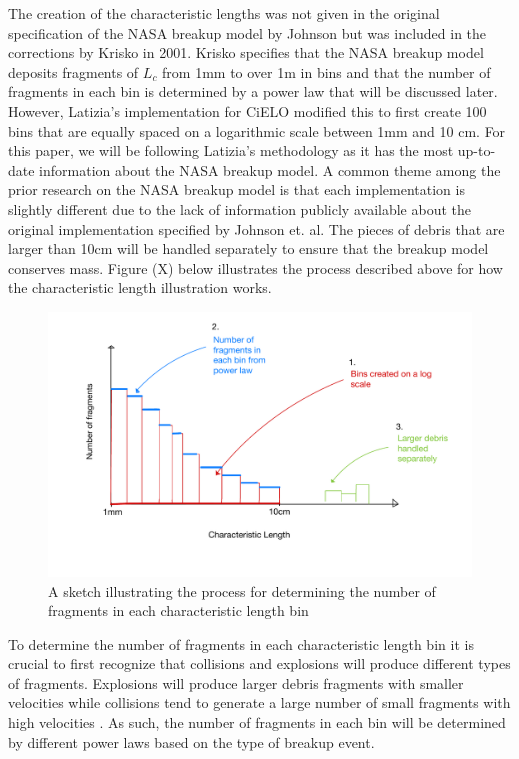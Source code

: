 \documentclass{article}
\begin{document}
The creation of the characteristic lengths was not given in the original specification of the NASA breakup model by Johnson but was included in the corrections by Krisko in 2001. Krisko specifies that the NASA breakup model deposits fragments of $L_c$ from 1mm to over 1m in bins and that the number of fragments in each bin is determined by a power law that will be discussed later. However, Latizia's implementation for CiELO modified this to first create 100 bins that are equally spaced on a logarithmic scale between 1mm and 10 cm. For this paper, we will be following Latizia's methodology as it has the most up-to-date information about the NASA breakup model. A common theme among the prior research on the NASA breakup model is that each implementation is slightly different due to the lack of information publicly available about the original implementation specified by Johnson et. al. The pieces of debris that are larger than 10cm will be handled separately to ensure that the breakup model conserves mass. Figure (X) below illustrates the process described above for how the characteristic length illustration works.

\begin{figure}[H]
	\centering
	\includegraphics[scale=0.6]{L_c_sketch}
	\caption{A sketch illustrating the process for determining the number of fragments in each characteristic length bin}
\end{figure}

To determine the number of fragments in each characteristic length bin it is crucial to first recognize that collisions and explosions will produce different types of fragments. Explosions will produce larger debris fragments with smaller velocities while collisions tend to generate a large number of small fragments with high velocities \citep{barrows_evolution_1996}.  As such, the number of fragments in each bin will be determined by different power laws based on the type of breakup event.
 
\end{document}
